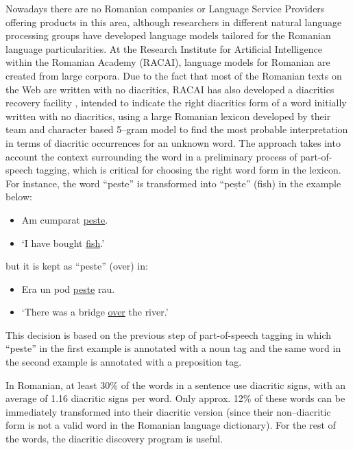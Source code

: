 \begin{multicols}{2}
Nowadays there are no Romanian companies or Language Service Providers offering products in this area, although researchers in different natural language processing groups have developed language models tailored for the Romanian language particularities. At the Research Institute for Artificial Intelligence within the Romanian Academy (RACAI), language models for Romanian are created from large corpora. Due to the fact that most of the Romanian texts on the Web are written with no diacritics, RACAI has also developed a diacritics recovery facility \cite{DIAC}, intended to indicate the right diacritics form of a word initially written with no diacritics, using a large Romanian lexicon developed by their team and character based 5--gram model to find the most probable interpretation in terms of diacritic occurrences for an unknown word. The approach takes into account the context surrounding the word in a preliminary process of part-of-speech tagging, which is critical for choosing the right word form in the lexicon. For instance, the word ``peste'' is transformed into ``pește'' (fish) in the example below:

\begin{example}
\begin{itemize}
\item []Am cumparat \underline{peste}.
\item []`I have bought \underline{fish}.'
\end{itemize}
\end{example}

but it is kept as ``peste'' (over) in:

\begin{example}
\begin{itemize}
\item []Era un pod \underline{peste} rau. 
\item []`There was a bridge \underline{over} the river.'
\end{itemize}
\end{example}

This decision is based on the previous step of part-of-speech tagging in which ``peste'' in the first example is annotated with a noun tag and the same word in the second example is annotated with a preposition tag.

In Romanian, at least 30\% of the words in a sentence use diacritic signs, with an average of 1.16 diacritic signs per word. Only approx. 12\% of these words can be immediately transformed into their diacritic version (since their non--diacritic form is not a valid word in the Romanian language dictionary). For the rest of the words, the diacritic discovery program is useful.


\end{multicols}
